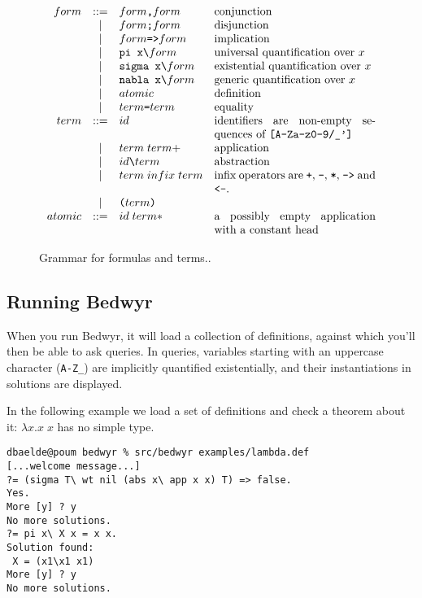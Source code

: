 \documentclass{article}
\begin{document}
\begin{figure}
\[\begin{array}{rclp{5cm}}
form &::=& form \texttt{,}  form & conjunction \\
     & | & form \texttt{;}  form & disjunction \\
     & | & form \texttt{=>} form & implication \\
     & | & \verb.pi x\.    form  & universal quantification over $x$ \\
     & | & \verb.sigma x\. form  & existential quantification over $x$ \\
     & | & \verb.nabla x\. form  & generic quantification over $x$ \\
     & | & atomic & definition \\
     & | & term \verb.=. term & equality \\
term &::=& id & identifiers are non-empty sequences of \verb.[A-Za-z0-9/_']. \\
     & | & term \; term+ & application \\
     & | & id \verb.\. term & abstraction \\
     & | & term \; infix \; term & infix operators are
             \verb.+., \verb.-., \verb.*., \verb.->. and \verb.<-.. \\
     & | & \verb.(. term \verb.). & \\
atomic &::=& id \; term* & a possibly empty application with a constant head \\
\end{array}\]
\caption{Grammar for formulas and terms..}
\label{concrete}
\end{figure}

\subsection{Running Bedwyr}

When you run Bedwyr, it will load a collection of definitions,
against which you'll then be able to ask queries.
In queries, variables starting with an uppercase character (\verb.A-Z_.)
are implicitly quantified existentially, and their instantiations in solutions
are displayed.

In the following example we load a set of 
definitions and check a theorem about it: $\lambda x.x\;x$ has no simple type.

\begin{verbatim}
dbaelde@poum bedwyr % src/bedwyr examples/lambda.def
[...welcome message...]
?= (sigma T\ wt nil (abs x\ app x x) T) => false.
Yes.
More [y] ? y
No more solutions.
?= pi x\ X x = x x.
Solution found:
 X = (x1\x1 x1)
More [y] ? y
No more solutions.
\end{verbatim}
\end{document}
